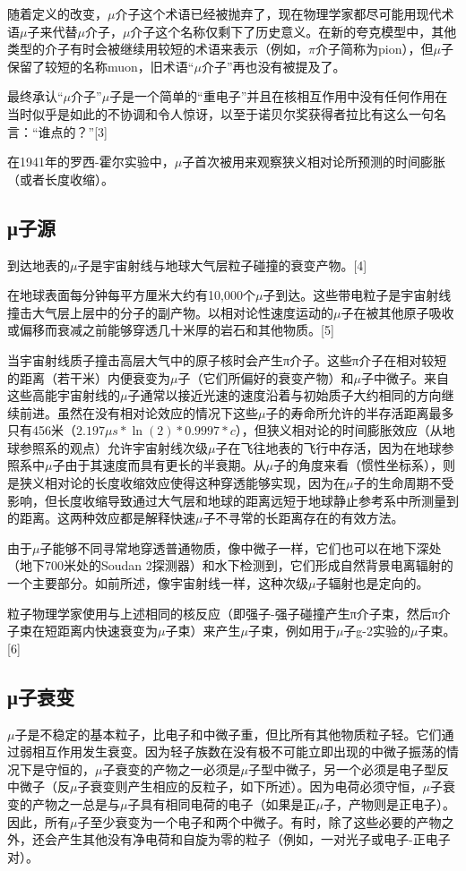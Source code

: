 随着定义的改变，$\mu$介子这个术语已经被抛弃了，现在物理学家都尽可能用现代术语$\mu$子来代替$\mu$介子，$\mu$介子这个名称仅剩下了历史意义。在新的夸克模型中，其他类型的介子有时会被继续用较短的术语来表示（例如，$\pi$介子简称为pion），但$\mu$子保留了较短的名称muon，旧术语“$\mu$介子”再也没有被提及了。

最终承认“$\mu$介子”$\mu$子是一个简单的“重电子”并且在核相互作用中没有任何作用在当时似乎是如此的不协调和令人惊讶，以至于诺贝尔奖获得者拉比有这么一句名言：“谁点的？”[3]

在1941年的罗西-霍尔实验中，$\mu$子首次被用来观察狭义相对论所预测的时间膨胀（或者长度收缩）。
\subsection{μ子源}
到达地表的$\mu$子是宇宙射线与地球大气层粒子碰撞的衰变产物。[4]

在地球表面每分钟每平方厘米大约有10,000个$\mu$子到达。这些带电粒子是宇宙射线撞击大气层上层中的分子的副产物。以相对论性速度运动的$\mu$子在被其他原子吸收或偏移而衰减之前能够穿透几十米厚的岩石和其他物质。[5]

当宇宙射线质子撞击高层大气中的原子核时会产生π介子。这些π介子在相对较短的距离（若干米）内便衰变为$\mu$子（它们所偏好的衰变产物）和$\mu$子中微子。来自这些高能宇宙射线的$\mu$子通常以接近光速的速度沿着与初始质子大约相同的方向继续前进。虽然在没有相对论效应的情况下这些$\mu$子的寿命所允许的半存活距离最多只有456米（$2.197\mu s * \ln(2) * 0.9997 * c$），但狭义相对论的时间膨胀效应（从地球参照系的观点）允许宇宙射线次级$\mu$子在飞往地表的飞行中存活，因为在地球参照系中$\mu$子由于其速度而具有更长的半衰期。从$\mu$子的角度来看（惯性坐标系），则是狭义相对论的长度收缩效应使得这种穿透能够实现，因为在$\mu$子的生命周期不受影响，但长度收缩导致通过大气层和地球的距离远短于地球静止参考系中所测量到的距离。这两种效应都是解释快速$\mu$子不寻常的长距离存在的有效方法。

由于$\mu$子能够不同寻常地穿透普通物质，像中微子一样，它们也可以在地下深处（地下700米处的Soudan 2探测器）和水下检测到，它们形成自然背景电离辐射的一个主要部分。如前所述，像宇宙射线一样，这种次级$\mu$子辐射也是定向的。

粒子物理学家使用与上述相同的核反应（即强子-强子碰撞产生π介子束，然后π介子束在短距离内快速衰变为$\mu$子束）来产生$\mu$子束，例如用于$\mu$子g-2实验的$\mu$子束。[6]

\subsection{μ子衰变}
$\mu$子是不稳定的基本粒子，比电子和中微子重，但比所有其他物质粒子轻。它们通过弱相互作用发生衰变。因为轻子族数在没有极不可能立即出现的中微子振荡的情况下是守恒的，$\mu$子衰变的产物之一必须是$\mu$子型中微子，另一个必须是电子型反中微子（反$\mu$子衰变则产生相应的反粒子，如下所述）。因为电荷必须守恒，$\mu$子衰变的产物之一总是与$\mu$子具有相同电荷的电子（如果是正$\mu$子，产物则是正电子）。因此，所有$\mu$子至少衰变为一个电子和两个中微子。有时，除了这些必要的产物之外，还会产生其他没有净电荷和自旋为零的粒子（例如，一对光子或电子-正电子对）。

